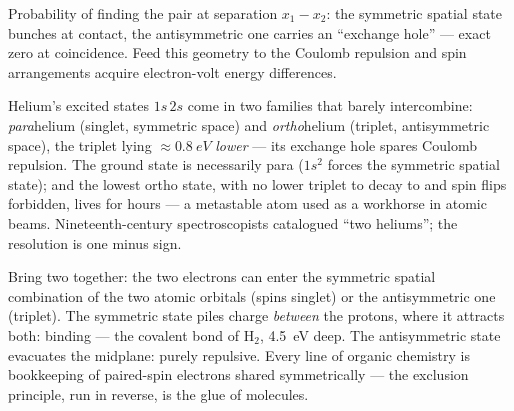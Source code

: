 \begin{omfigure}

{\small Probability of finding the pair at separation $x_1 - x_2$:
the symmetric spatial state bunches at contact, the antisymmetric
one carries an ``exchange hole'' --- exact zero at coincidence.
Feed this geometry to the Coulomb repulsion and spin arrangements
acquire electron-volt energy differences.}
\end{omfigure}

\begin{example}\label{ex:b3:identical-particles:helium}
Helium's excited states $1s\,2s$ come in two families that barely
intercombine: \emph{para}helium (singlet, symmetric space) and
\emph{ortho}helium (triplet, antisymmetric space), the triplet lying
$\approx\qty{0.8}{eV}$ \emph{lower} --- its exchange hole spares
Coulomb repulsion. The ground state is necessarily para ($1s^2$
forces the symmetric spatial state); and the lowest ortho state,
with no lower triplet to decay to and spin flips forbidden, lives
for hours --- a metastable atom used as a workhorse in atomic
beams. Nineteenth-century spectroscopists catalogued ``two
heliums''; the resolution is one minus sign.
\end{example}

\begin{example}\label{ex:b3:identical-particles:bond}
Bring two  together: the two electrons can enter the
symmetric spatial combination of the two atomic orbitals (spins
singlet) or the antisymmetric one (triplet). The symmetric state
piles charge \emph{between} the protons, where it attracts both:
binding --- the covalent bond of H$_2$, \qty{4.5}{eV} deep. The
antisymmetric state evacuates the midplane: purely repulsive. Every
line of organic chemistry is bookkeeping of paired-spin electrons
shared symmetrically --- the exclusion principle, run in reverse, is
the glue of molecules.
\end{example}

